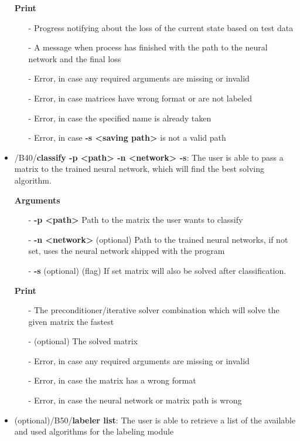 \documentclass[parskip=full]{scrartcl}
\begin{document}
\begin{itemize}
\textbf{Print}
	\begin{itemize}
	\item[-]Progress notifying about the loss of the current state based on test data
	\item[-]A message when process has finished with the path to the \gls{neural network} and the final loss
	\item[-]Error, in case any required arguments are missing or invalid
	\item[-]Error, in case matrices have wrong format or are not labeled
	\item[-]Error, in case the specified name is already taken
	\item[-]Error, in case \textbf{-s <saving path>} is not a valid path
	\end{itemize}

\item/B40/\textbf{classify -p <path> -n <network> -s}:
\newline The user is able to pass a matrix to the trained \gls{neural network}, which will find the best solving \gls{algorithm}.

\textbf{Arguments}
	\begin{itemize}
	\item[-]\textbf{-p <path>} Path to the matrix the user wants to classify
	\item[-]\textbf{-n <network>} (optional) Path to the trained \glspl{neural network}, if not set, uses the \gls{neural network} shipped with the program
	\item[-]\textbf{-s} (optional) (flag) If set matrix will also be solved after classification.
	\end{itemize}

\textbf{Print}
	\begin{itemize}
	\item[-]The \gls{preconditioner}/\gls{iterative solver} combination which will solve the given matrix the fastest
	\item[-](optional) The solved matrix
	\item[-]Error, in case any required arguments are missing or invalid
	\item[-]Error, in case the matrix has a wrong format
	\item[-]Error, in case the \gls{neural network} or matrix path is wrong
	\end{itemize}

\item(optional)/B50/\textbf{labeler list}:
\newline The user is able to retrieve a list of the available and used algorithms for the labeling module


\end{itemize}
\end{document}

